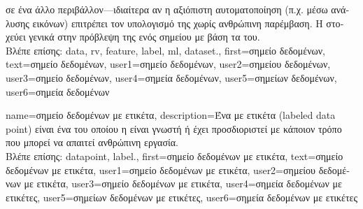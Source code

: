 {{ 		 \foreignlanguage{greek}{σε ένα άλλο περιβάλλον—ιδιαίτερα αν η αξιόπιστη αυτοματοποίηση  
 		(π.χ. μέσω ανάλυσης εικόνων) επιτρέπει τον υπολογισμό της χωρίς ανθρώπινη παρέμβαση. Η}  
   		\foreignlanguage{greek}{στοχεύει γενικά στην πρόβλεψη της}  \foreignlanguage{greek}{ενός σημείου} 
		 \foreignlanguage{greek}{με βάση τα}  \foreignlanguage{greek}{του}. 
		\\
		\foreignlanguage{greek}{Βλέπε επίσης:} \gls{data}, \gls{rv}, \gls{feature}, \gls{label}, \gls{ml}, \gls{dataset}.}, 
	first={\foreignlanguage{greek}{σημεί\-ο δεδομένων}},
	text={\foreignlanguage{greek}{σημεί\-ο δεδομένων}},
	user1={\foreignlanguage{greek}{ση\-μεί\-ο δεδομένων}}, %
	user2={\foreignlanguage{greek}{ση\-μεί\-ου δεδομένων}}, %
	user3={\foreignlanguage{greek}{σημείο δεδομένων}}, %
	user4={\foreignlanguage{greek}{ση\-μεί\-α δεδομένων}}, %
	user5={\foreignlanguage{greek}{ση\-μεί\-ων δεδομένων}}, %
	user6={\foreignlanguage{greek}{ση\-μεί\-α δεδομένων}} %
}

{name={\foreignlanguage{greek}{σημείο δεδομένων με ετικέτα}},
 	description={\foreignlanguage{greek}{Ένα}  \foreignlanguage{greek}{με 
		ετικέτα} (labeled data point) \foreignlanguage{greek}{είναι ένα} 
		 \foreignlanguage{greek}{του οποίου η}  \foreignlanguage{greek}{είναι γνωστή 
		ή έχει προσδιοριστεί με κάποιον τρόπο που μπορεί να απαιτεί ανθρώπινη εργασία.} 
		\\
		\foreignlanguage{greek}{Βλέπε επίσης:} \gls{datapoint}, \gls{label}.},
 	first={\foreignlanguage{greek}{ση\-μεί\-ο δεδομένων με ετικέτα}},
 	text={\foreignlanguage{greek}{ση\-μεί\-ο δεδομένων με ετικέτα}},
 	user1={\foreignlanguage{greek}{σημείο δεδομένων με ετικέτα}}, %
 	user2={\foreignlanguage{greek}{σημείου δεδομένων με ετικέτα}}, %
 	user3={\foreignlanguage{greek}{σημείο δεδομένων με ετικέτα}}, %
 	user4={\foreignlanguage{greek}{σημεία δεδομένων με ετικέτες}}, %
 	user5={\foreignlanguage{greek}{σημείων δεδομένων με ετικέτες}}, %
 	user6={\foreignlanguage{greek}{σημεία δεδομένων με ετικέτες}} %
}%

